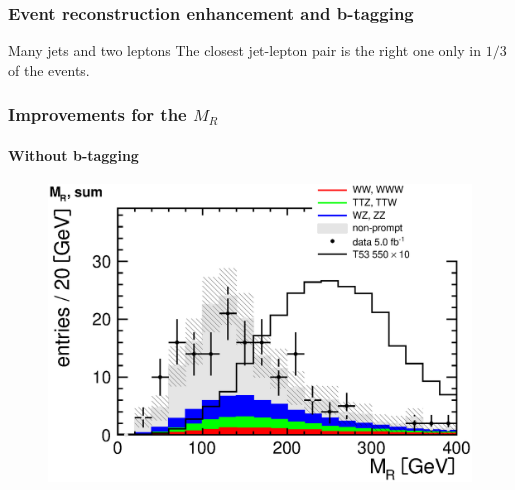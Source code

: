 \documentclass[ukenglish]{beamer}
\begin{document}
\begin{frame}
    \frametitle{Event reconstruction enhancement and b-tagging}
    \begin{block}
        {Many jets and two leptons}
        The closest jet-lepton pair is the right one only in $1/3$ of the
        events.
    \end{block}

\end{frame}

\begin{frame}
    \frametitle{Improvements for the $M_R$}
    \framesubtitle{Without b-tagging}
        \begin{figure}[h!]
            \centering
                \includegraphics[height=.8\textheight]{mr_sum.eps}
        \end{figure}
\end{frame}
\end{document}
